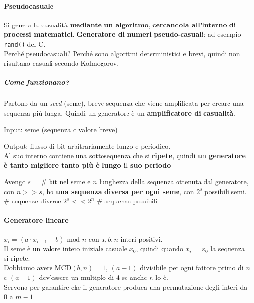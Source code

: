 \documentclass[10pt]{book}
\begin{document}
\paragraph{Pseudocasuale} Si genera la casualità \textbf{mediante un algoritmo}, \textbf{cercandola all'interno di processi matematici}. \textbf{Generatore di numeri pseudo-casuali}: ad esempio \texttt{rand()} del C.\\
Perché pseudocasuali? Perché sono algoritmi deterministici e brevi, quindi non risultano casuali secondo Kolmogorov.
\subparagraph{Come funzionano?} Partono da un \textit{seed} (seme), breve sequenza che viene amplificata per creare una sequenza più lunga. Quindi un generatore è un \textbf{amplificatore di casualità}.
\begin{list}{}{}
	\item Input: seme (sequenza o valore breve)
	\item Output: flusso di bit arbitrariamente lungo e periodico.\\
	Al suo interno contiene una sottosequenza che si \textbf{ripete}, quindi \textbf{un generatore è tanto migliore tanto più è lungo il suo periodo}
	\item Avengo $s$ = \# bit nel seme e $n$ lunghezza della sequenza ottenuta dal generatore, con $n >> s$, ho \textbf{una sequenza diversa per ogni seme}, con $2^s$ possibili semi.
	\\\# sequenze diverse $2^s << 2^n$ \# sequenze possibili
\end{list}
\paragraph{Generatore lineare} $x_i = (a\cdot x_{i-1} + b)$ mod $n$ con $a,b,n$ interi positivi.\\
Il seme è un valore intero iniziale casuale $x_0$, quindi quando $x_i$ = $x_0$ la sequenza si ripete.\\
Dobbiamo avere MCD$(b,n)=1$, $(a-1)$ divisibile per ogni fattore primo di $n$ e $(a-1)$ dev'essere un multiplo di 4 se anche $n$ lo è.\\
Servono per garantire che il generatore produca una permutazione degli interi da 0 a $m-1$
\end{document}
